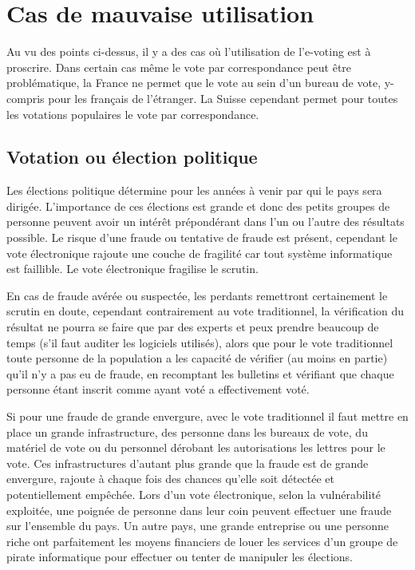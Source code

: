 \documentclass[../report]{subfiles}
\begin{document}
\section{Cas de mauvaise utilisation}

Au vu des points ci-dessus, il y a des cas où l'utilisation de l'e-voting est à proscrire. 
Dans certain cas même le vote par correspondance peut être problématique, la France ne permet que 
le vote au sein d'un bureau de vote, y-compris pour les français de l'étranger. La Suisse cependant 
permet pour toutes les votations populaires le vote par correspondance.

\subsection{Votation ou élection politique}

Les élections politique détermine pour les années à venir par qui le pays sera dirigée. 
L'importance de ces élections est grande et donc des petits groupes de personne peuvent 
avoir un intérêt prépondérant dans l'un ou l'autre des résultats possible. 
Le risque d'une fraude ou tentative de fraude est présent, cependant le vote électronique 
rajoute une couche de fragilité car tout système informatique est faillible.
Le vote électronique fragilise le scrutin.

En cas de fraude avérée ou suspectée, les perdants remettront certainement le scrutin en doute, 
cependant contrairement au vote traditionnel, la vérification du résultat ne pourra se faire que 
par des experts et peux prendre beaucoup de temps (s'il faut auditer les logiciels utilisés), alors que 
pour le vote traditionnel toute personne de la population a les capacité de vérifier (au moins en partie)
qu'il n'y a pas eu de fraude, en recomptant les bulletins et vérifiant que chaque personne étant inscrit comme ayant
voté a effectivement voté.

Si pour une fraude de grande envergure, avec le vote traditionnel il faut mettre en place un grande infrastructure, des
personne dans les bureaux de vote, du matériel de vote ou du personnel dérobant les autorisations les lettres pour le vote.
Ces infrastructures d'autant plus grande que la fraude est de grande envergure, rajoute à chaque fois des chances qu'elle 
soit détectée et potentiellement empêchée. Lors d'un vote électronique, selon la vulnérabilité exploitée, une poignée
de personne dans leur coin peuvent effectuer une fraude sur l'ensemble du pays.
Un autre pays, une grande entreprise ou une personne riche ont parfaitement les moyens financiers de louer les services
d'un groupe de pirate informatique pour effectuer ou tenter de manipuler les élections.
\end{document}
